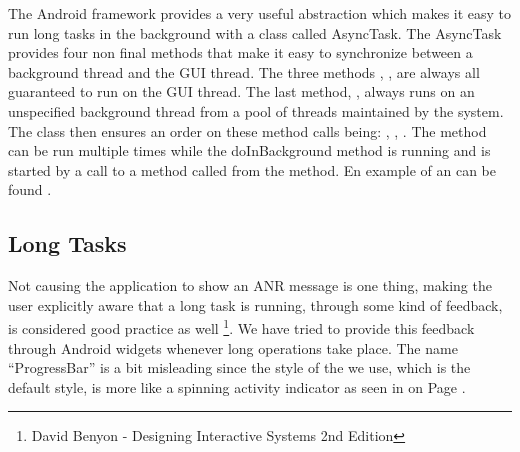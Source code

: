 The Android framework provides a very useful abstraction which makes it easy to run long tasks in the background with a class called AsyncTask. The AsyncTask provides four non final methods that make it easy to synchronize between a background thread and the GUI thread. The three methods , ,  are always all guaranteed to run on the GUI thread. The last method, , always runs on an unspecified background thread from a pool of threads maintained by the system. The class then ensures an order on these method calls being: , , . The  method can be run multiple times while the doInBackground method is running and is started by a call to a method called  from the  method. En example of an  can be found .

\subsection{Long Tasks}

Not causing the application to show an ANR message is one thing, making the user explicitly aware that a long task is running, through some kind of feedback, is considered good practice as well \footnote{David Benyon - Designing Interactive Systems 2nd Edition}. We have tried to provide this feedback through Android  widgets whenever long operations take place. The name ``ProgressBar'' is a bit misleading since the style of the  we use, which is the default style, is more like a spinning activity indicator as seen in  on Page \pageref{fig:dialog_waiting}. 